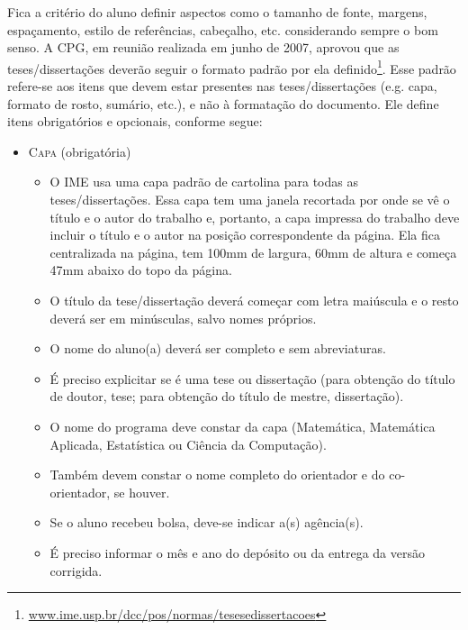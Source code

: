 Fica a critério do aluno definir aspectos como o tamanho de fonte, margens,
espaçamento, estilo de referências, cabeçalho, etc. considerando sempre o
bom senso. A CPG, em reunião realizada em junho de 2007, aprovou que as
teses/dissertações deverão seguir o formato padrão por ela
definido\footnote{\url{www.ime.usp.br/dcc/pos/normas/tesesedissertacoes}}.
Esse padrão refere-se aos itens que devem estar presentes nas teses/dissertações
(e.g. capa, formato de rosto, sumário, etc.), e não à formatação do documento.
Ele define itens obrigatórios e opcionais, conforme segue:

\begin{itemize}
  \item \textsc{Capa} (obrigatória)
  \begin{itemize}
    \item O IME usa uma capa padrão de cartolina para todas as
    teses/dissertações.  Essa capa tem uma janela recortada por onde se
    vê o título e o autor do trabalho e, portanto, a capa impressa do
    trabalho deve incluir o título e o autor na posição correspondente da
    página. Ela fica centralizada na página, tem 100mm de largura, 60mm de
    altura e começa 47mm abaixo do topo da página.

    \item O título da tese/dissertação deverá começar com letra maiúscula
    e o resto deverá ser em minúsculas, salvo nomes próprios.

    \item O nome do aluno(a) deverá ser completo e sem abreviaturas.

    \item É preciso explicitar se é uma tese ou dissertação (para
    obtenção do título de doutor, tese; para obtenção do título de
    mestre, dissertação).

    \item O nome do programa deve constar da capa (Matemática,
    Matemática Aplicada, Estatística ou Ciência da Computação).

    \item Também devem constar o nome completo do orientador e do
    co-orientador, se houver.

    \item Se o aluno recebeu bolsa, deve-se indicar a(s) agência(s).

    \item É preciso informar o mês e ano do depósito ou da entrega da
    versão corrigida.
  \end{itemize}


\end{itemize}
